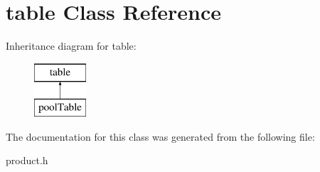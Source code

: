 \hypertarget{classtable}{}\section{table Class Reference}
\label{classtable}
Inheritance diagram for table\+:\begin{figure}[H]
\begin{center}
\leavevmode
\includegraphics[height=2.000000cm]{classtable}
\end{center}
\end{figure}


The documentation for this class was generated from the following file\+:\begin{DoxyCompactItemize}
\item 
product.\+h\end{DoxyCompactItemize}
